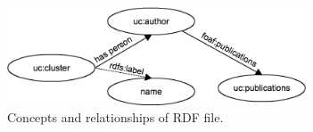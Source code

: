 \documentclass[11pt]{article}
\begin{document}
\begin{figure}[ht!]
	\centering
		\includegraphics[height=2.9cm]{anotacion.png}
	\caption{Concepts and relationships of RDF file.}
	\label{fig:descriptionrdf}
\end{figure}








\end{document}

